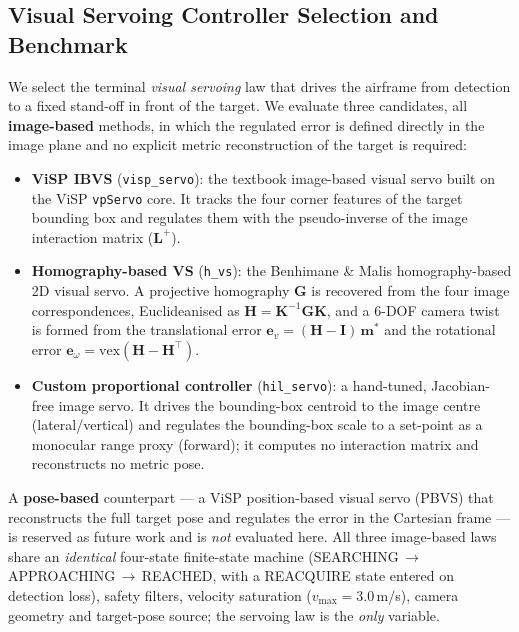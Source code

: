 \subsection{Visual Servoing Controller Selection and Benchmark}
\label{sec:vs_bench}

We select the terminal \emph{visual servoing} law that drives the airframe from
detection to a fixed stand-off in front of the target. We evaluate three
candidates, all \textbf{image-based} methods, in which the regulated error is
defined directly in the image plane and no explicit metric reconstruction of
the target is required:
\begin{itemize}
  \item \textbf{ViSP IBVS} (\texttt{visp\_servo}): the textbook image-based
  visual servo built on the ViSP \texttt{vpServo} core. It tracks the four
  corner features of the target bounding box and regulates them with the
  pseudo-inverse of the image interaction matrix ($\mathbf{L}^{+}$).
  \item \textbf{Homography-based VS} (\texttt{h\_vs}): the Benhimane \&
  Malis homography-based 2D visual servo. A projective homography
  $\mathbf{G}$ is recovered from the four image correspondences,
  Euclideanised as $\mathbf{H}=\mathbf{K}^{-1}\mathbf{G}\mathbf{K}$, and a
  $6$-DOF camera twist is formed from the translational error
  $\mathbf{e}_v=(\mathbf{H}-\mathbf{I})\,\mathbf{m}^{\!*}$ and the rotational
  error $\mathbf{e}_\omega=\mathrm{vex}(\mathbf{H}-\mathbf{H}^{\top})$.
  \item \textbf{Custom proportional controller} (\texttt{hil\_servo}): a
  hand-tuned, Jacobian-free image servo. It drives the bounding-box centroid
  to the image centre (lateral/vertical) and regulates the bounding-box scale
  to a set-point as a monocular range proxy (forward); it computes no
  interaction matrix and reconstructs no metric pose.
\end{itemize}
A \textbf{pose-based} counterpart --- a ViSP position-based visual servo
(PBVS) that reconstructs the full target pose and regulates the error in the
Cartesian frame --- is reserved as future work and is \emph{not} evaluated
here. All three image-based laws share an \emph{identical} four-state
finite-state machine
(SEARCHING\,$\rightarrow$\,APPROACHING\,$\rightarrow$\,REACHED, with a
REACQUIRE state entered on detection loss), safety filters, velocity saturation
($v_{\max}=3.0$\,m/s), camera geometry and target-pose source; the servoing law
is the \emph{only} variable.

